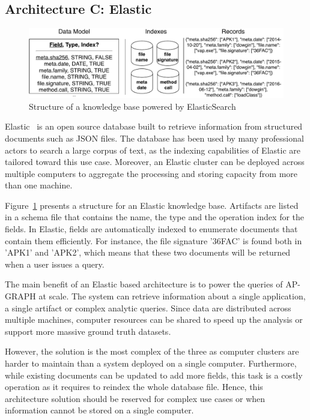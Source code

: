\subsection{Architecture C: Elastic}

\begin{figure}[!ht]
        \centering
	\includegraphics[width=\linewidth]{figures/apgraph/architectures/elastic.pdf}
	\caption{Structure of a knowledge base powered by ElasticSearch}
	\label{figure:apgraph:architectures:elastic}
\end{figure}

Elastic~\cite{elastic_elastic_nodate} is an open source database built to retrieve information from structured documents such as JSON files.
The database has been used by many professional actors to search a large corpus of text, as the indexing capabilities of Elastic are tailored toward this use case.
Moreover, an Elastic cluster can be deployed across multiple computers to aggregate the processing and storing capacity from more than one machine.

Figure~\ref{figure:apgraph:architectures:elastic} presents a structure for an Elastic knowledge base.
Artifacts are listed in a schema file that contains the name, the type and the operation index for the fields.
In Elastic, fields are automatically indexed to enumerate documents that contain them efficiently.
For instance, the file signature '36FAC' is found both in 'APK1' and 'APK2', which means that these two documents will be returned when a user issues a query.

The main benefit of an Elastic based architecture is to power the queries of AP-GRAPH at scale.
The system can retrieve information about a single application, a single artifact or complex analytic queries.
Since data are distributed across multiple machines, computer resources can be shared to speed up the analysis or support more massive ground truth datasets.

However, the solution is the most complex of the three as computer clusters are harder to maintain than a system deployed on a single computer.
Furthermore, while existing documents can be updated to add more fields, this task is a costly operation as it requires to reindex the whole database file.
Hence, this architecture solution should be reserved for complex use cases or when information cannot be stored on a single computer.
